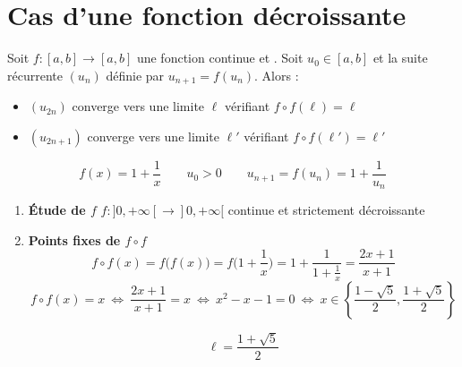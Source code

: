 \section{Cas d'une fonction décroissante}


\begin{frame}
\begin{proposition}
Soit $f : [a,b] \to [a,b]$ une fonction continue et .
Soit $u_0 \in [a,b]$ et la suite récurrente $(u_n)$ définie par $u_{n+1}=f(u_n)$. Alors :
\begin{itemize}
  \item $(u_{2n})$ converge vers une limite $\ell$  vérifiant $f\circ f(\ell)=\ell$
  \item $(u_{2n+1})$ converge vers une limite $\ell'$ vérifiant $f\circ f(\ell')=\ell'$
\end{itemize}
\end{proposition}

\end{frame}


\begin{frame}
\begin{exemple}
$$f(x)=1+\frac1x \qquad u_0 >0 \qquad u_{n+1} = f(u_n)= 1 + \frac{1}{u_n}$$

\pause

\begin{enumerate}
  \item \textbf{\'Etude de $f$} \quad  $f : ]0,+\infty[\to ]0,+\infty[$  
  continue et strictement décroissante

\pause

  \item \textbf{Points fixes de $f\circ f$} 
{\small  $$f\circ f(x)= f\big( f(x)\big)= f\big(1+\frac1x\big)= 1+ \frac{1}{1+\frac1x}= \frac{2x+1}{x+1}$$}
\pause
{\footnotesize    $$f\circ f(x)=x \ \Leftrightarrow \  \frac{2x+1}{x+1} = x  \ \Leftrightarrow \ x^2-x-1=0  \ \Leftrightarrow \  x \in 
\left\{\frac{1-\sqrt{5}}{2},\frac{1+\sqrt{5}}{2}\right\}$$}  

\pause
 $$\ell=\frac{1+\sqrt{5}}{2}$$

\end{enumerate}

\end{exemple}
\end{frame}
  
  

\begin{frame}



\end{frame}

